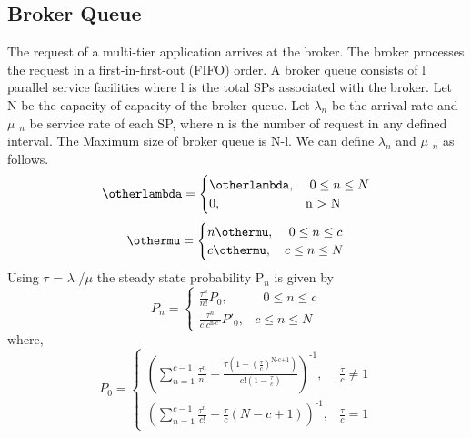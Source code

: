 \documentclass[conference]{IEEEtran}
\newcommand\tab[1][0.8cm]{\hspace*{#1}}
\begin{document}
\subsection{Broker Queue}
\tab The request of a multi-tier application arrives at the broker.
The broker processes the request in a first-in-first-out (FIFO)
order. A broker queue consists of l parallel service facilities
where l is the total SPs associated with the broker. Let N be
the capacity of capacity of the broker queue. Let $\lambda$$_n$ be the arrival rate and $\mu$ $_n$ be service rate of each
SP, where n is the number of request in any defined interval.
\newline
The Maximum size of broker queue is N-l. We can define 
$\lambda$$_n$ and $\mu$ $_n$ as follows.
\begin{equation}
{\otherlambda} =\begin{cases}
\otherlambda,& \text{ } 0\leq n\leq N\\
0,              & \text{n $>$ N}
\end{cases}
\end{equation}
\begin{equation}
{\othermu} =\begin{cases}
n\othermu,& \text{ } 0\leq n\leq c\\
c\othermu,              & c\leq n\leq N
\end{cases}
\end{equation}
Using $\tau$ = $\lambda$ /$\mu$ the steady state probability P$_n$ is given by
\begin{equation}
P_n =\begin{cases}
\frac{\tau ^n}{n!}P_0,& \text{ } 0\leq n\leq c\\
\frac{\tau ^n}{c!c^{\text{n-c'}}}P'_0,              & c\leq n\leq N
\end{cases}
\end{equation}
where,
\begin{equation}
P_0 =\begin{cases}
( \sum_{n=1}^{c-1} \frac{\tau ^n}{n!}+ \frac{\tau(1-(\frac{\tau}{c})^{\text{N-c+1}})}{c!(1-\frac{\tau}{c})} )^{\text{-1}},& \frac{\tau}{c} \not= 1 \\
( \sum_{n=1}^{c-1}\frac{\tau ^n}{c!}+\frac{\tau}{c}(N-c+1))^{\text{-1}},              & \frac{\tau}{c} = 1
\end{cases}
\end{equation}
\end{document}
